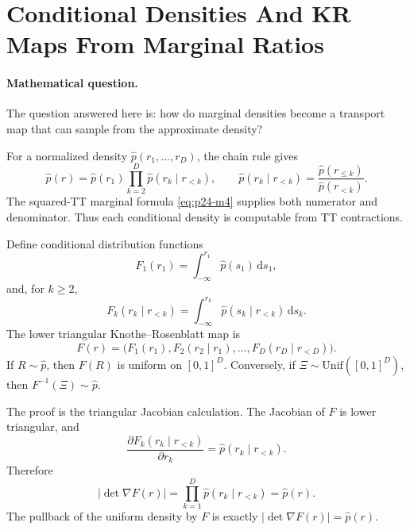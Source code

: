 \documentclass[11pt]{article}
\numberwithin{equation}{section}
\newcommand{\dd}{\,\mathrm d}
\begin{document}
\section{Conditional Densities And KR Maps From Marginal Ratios}

\paragraph{Mathematical question.}
The question answered here is: how do marginal densities become a transport map
that can sample from the approximate density?

For a normalized density \(\widehat p(r_1,\ldots,r_D)\), the chain rule gives
\begin{equation}
    \widehat p(r)
    =
    \widehat p(r_1)
    \prod_{k=2}^D
    \widehat p(r_k\mid r_{<k}),
    \qquad
    \widehat p(r_k\mid r_{<k})
    =
    \frac{\widehat p(r_{\le k})}{\widehat p(r_{<k})}.
    \label{eq:p24-k1}
\end{equation}
The squared-TT marginal formula \eqref{eq:p24-m4} supplies both numerator and denominator.
Thus each conditional density is computable from TT contractions.

Define conditional distribution functions
\begin{equation}
    F_1(r_1)=\int_{-\infty}^{r_1}\widehat p(s_1)\dd s_1,
    \label{eq:p24-k2}
\end{equation}
and, for \(k\ge2\),
\begin{equation}
    F_k(r_k\mid r_{<k})
    =
    \int_{-\infty}^{r_k}
    \widehat p(s_k\mid r_{<k})\dd s_k.
    \label{eq:p24-k3}
\end{equation}
The lower triangular Knothe--Rosenblatt map is
\begin{equation}
    F(r)
    =
    \bigl(
    F_1(r_1),
    F_2(r_2\mid r_1),
    \ldots,
    F_D(r_D\mid r_{<D})
    \bigr).
    \label{eq:p24-k4}
\end{equation}
If \(R\sim\widehat p\), then \(F(R)\) is uniform on \([0,1]^D\).  Conversely, if
\(\Xi\sim \mathrm{Unif}([0,1]^D)\), then \(F^{-1}(\Xi)\sim\widehat p\).

The proof is the triangular Jacobian calculation.  The Jacobian of \(F\) is
lower triangular, and
\[
    \frac{\partial F_k(r_k\mid r_{<k})}{\partial r_k}
    =
    \widehat p(r_k\mid r_{<k}).
\]
Therefore
\begin{equation}
    |\det\nabla F(r)|
    =
    \prod_{k=1}^D \widehat p(r_k\mid r_{<k})
    =
    \widehat p(r).
    \label{eq:p24-k5}
\end{equation}
The pullback of the uniform density by \(F\) is exactly
\(|\det\nabla F(r)|=\widehat p(r)\).
\end{document}
